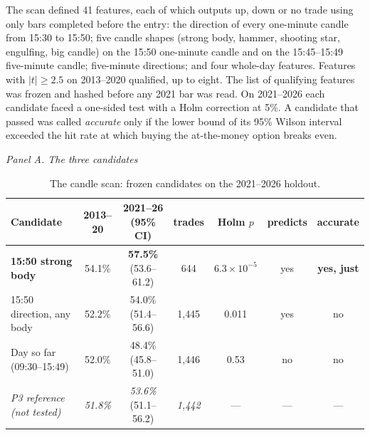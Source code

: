 \documentclass[12pt,letterpaper]{article}
\begin{document}
The scan defined 41 features, each of which outputs up, down or no trade using
only bars completed before the entry: the direction of every one-minute candle
from 15:30 to 15:50; five candle shapes (strong body, hammer, shooting star,
engulfing, big candle) on the 15:50 one-minute candle and on the 15:45--15:49
five-minute candle; five-minute directions; and four whole-day features. Features
with $|t| \ge 2.5$ on 2013--2020 qualified, up to eight. The list of qualifying
features was frozen and hashed before any 2021 bar was read. On 2021--2026 each
candidate faced a one-sided test with a Holm correction at 5\%. A candidate that
passed was called \emph{accurate} only if the lower bound of its 95\% Wilson
interval exceeded the hit rate at which buying the at-the-money option breaks
even.

\begin{table}[htbp]
\centering
\caption{The candle scan: frozen candidates on the 2021--2026 holdout.}
\label{tab:scan}
\begin{minipage}{\linewidth}\centering
\textit{Panel A. The three candidates}\par\smallskip
\setlength{\tabcolsep}{4pt}
\begin{tabular}{lcccccc}
\toprule
Candidate & 2013--20 & 2021--26 (95\% CI) & trades & Holm $p$ & predicts & accurate \\
\midrule
\textbf{15:50 strong body} & 54.1\% & \textbf{57.5\%} (53.6--61.2) & 644 & $6.3\times10^{-5}$ & yes & \textbf{yes, just} \\
15:50 direction, any body & 52.2\% & 54.0\% (51.4--56.6) & 1{,}445 & 0.011 & yes & no \\
Day so far (09:30--15:49) & 52.0\% & 48.4\% (45.8--51.0) & 1{,}446 & 0.53 & no & no \\
\midrule
\emph{P3 reference (not tested)} & \emph{51.8\%} & \emph{53.6\%} (51.1--56.2) & \emph{1{,}442} & --- & --- & --- \\
\bottomrule
\end{tabular}
\end{minipage}


\end{table}
\end{document}
